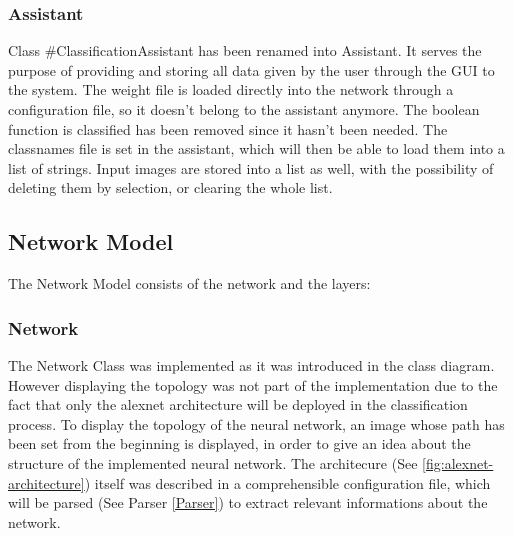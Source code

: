 \documentclass[parskip=full]{scrartcl}
\newcommand\tab[1][1cm]{\hspace*{#1}}
\begin{document}
	\subsubsection {Assistant}
	\tab Class #ClassificationAssistant has been renamed into Assistant. It serves the purpose of providing and storing all data given by the user through the GUI to the system. The weight file is loaded directly into the network through a configuration file, so it doesn't belong to the assistant anymore. The boolean function is classified has been removed since it hasn't been needed. The classnames file is set in the assistant, which will then be able to load them into a list of strings. Input images are stored into a list as well, with the possibility of deleting them by selection, or clearing the whole list.

	\subsection {Network Model}
	\tab The Network Model consists of the network and the layers:
	
		\subsubsection {Network}
		\tab The Network Class was implemented as it was introduced in the class diagram. However displaying the topology was not part of the implementation due to the fact that only the alexnet architecture will be deployed in the classification process. To display the topology of the neural network, an image whose path has been set from the beginning is displayed, in order to give an idea about the structure of the implemented neural network.
		The architecure (See \ref{fig:alexnet-architecture}) itself was described in a comprehensible configuration file, which will be parsed (See Parser \ref{Parser}) to extract relevant informations about the network.
		
\end{document}
